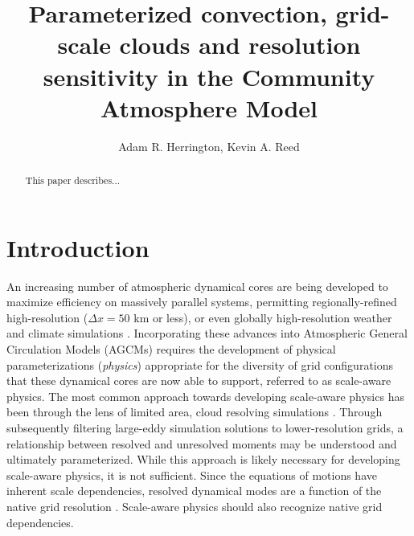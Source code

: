 \documentclass[times]{qjrms4}
\begin{document}

\title{Parameterized convection, grid-scale clouds and resolution sensitivity in the Community Atmosphere Model}

\author{Adam R. Herrington\corrauth, Kevin A. Reed}
\address{School of Marine and Atmospheric Sciences, Stony Brook University, Stony Brook, NY 11794}


\begin{abstract}
This paper describes...
\end{abstract}


\maketitle

\section{Introduction}

An increasing number of atmospheric dynamical cores are being developed to maximize efficiency on massively parallel systems, permitting regionally-refined high-resolution ($\Delta x = 50$ km or less), or even globally high-resolution weather and climate simulations \citep{MPASatm,Z2014QJRMS,HETAL2016JCLIM,DCMIP16,LetAl2018JAMES}. Incorporating these advances into Atmospheric General Circulation Models (AGCMs) requires the development of physical parameterizations ({\em{physics}}) appropriate for the diversity of grid configurations that these dynamical cores are now able to support, referred to as scale-aware physics. The most common approach towards developing scale-aware physics has been through the lens of limited area, cloud resolving simulations \citep[e.g.,][]{PC2008JAS,AW2013JAS,SZ2018JCLIM}. Through subsequently filtering large-eddy simulation solutions to lower-resolution grids, a relationship between resolved and unresolved moments may be understood and ultimately parameterized. While this approach is likely necessary for developing scale-aware physics, it is not sufficient. Since the equations of motions have inherent scale dependencies, resolved dynamical modes are a function of the native grid resolution \citep{O1981JAS,WETAL1997MWR,PG2006JAS,JR2016QJRMS,J2017JAMES}. Scale-aware physics should also recognize native grid dependencies.
\end{document}
